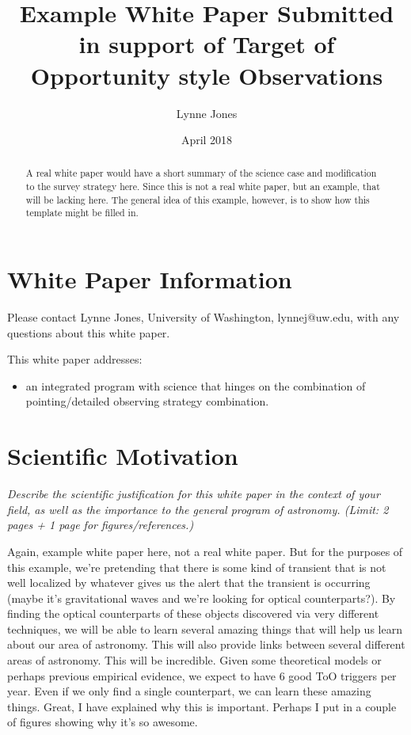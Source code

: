 \documentclass[11pt]{article}
\title{Example White Paper Submitted in support of Target of Opportunity style Observations}
\author{Lynne Jones}
\date{April 2018}
\begin{document}
\maketitle

\begin{abstract}
A real white paper would have a short summary of the science case and modification to the survey strategy
here. Since this is not a real white paper, but an example, that will be lacking here. The general idea of this
example, however, is to show how this template might be filled in. 
\end{abstract}

\section{White Paper Information}
Please contact Lynne Jones, University of Washington, lynnej@uw.edu, with any questions about this white paper. 

This white paper addresses:
\begin{itemize} 
\item an integrated program with science that hinges on the combination of pointing/detailed 
	observing strategy combination. 
\end{itemize}  

\clearpage

\section{Scientific Motivation}

\begin{footnotesize}
{\it Describe the scientific justification for this white paper in the context
of your field, as well as the importance to the general program of astronomy. 
(Limit: 2 pages + 1 page for figures/references.)}
\end{footnotesize}

Again, example white paper here, not a real white paper. But for the purposes of this
example, we're pretending that there is some kind of transient that is not well localized
by whatever gives us the alert that the transient is occurring (maybe it's gravitational waves 
and we're looking for optical counterparts?).  By finding the optical counterparts of
these objects discovered via very different techniques, we will be able to learn 
several amazing things that will help us learn about our area of astronomy. This will 
also provide links between several different areas of astronomy. This will be incredible. 
Given some theoretical models or perhaps previous empirical evidence, we expect to have 6 good ToO triggers per year. 
Even if we only find a single counterpart, we can learn these amazing things.
Great, I have explained why this is important.  Perhaps I put in a couple of figures showing why it's so awesome.
\end{document}
